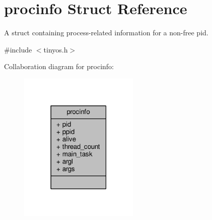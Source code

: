 \hypertarget{structprocinfo}{}\section{procinfo Struct Reference}
\label{structprocinfo}


A struct containing process-\/related information for a non-\/free pid.  




{\ttfamily \#include $<$tinyos.\+h$>$}



Collaboration diagram for procinfo\+:\nopagebreak
\begin{figure}[H]
\begin{center}
\leavevmode
\includegraphics[width=162pt]{structprocinfo__coll__graph}
\end{center}
\end{figure}
